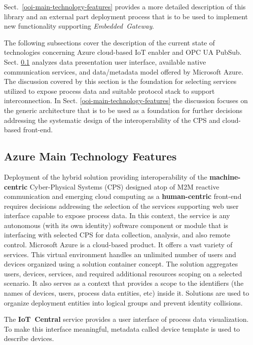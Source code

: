 \documentclass[runningheads]{llncs}
\begin{document}
Sect.~\ref{ooi-main-technology-features} provides a more detailed description of this library and an external part deployment process that is to be used to implement new functionality supporting \emph{Embedded\ Gateway}.

The following subsections cover the description of the current state of technologies concerning Azure cloud-based IoT enabler and OPC UA PubSub. Sect. \ref{azure-main-technology-features} analyzes data presentation user interface, available native communication services, and data/metadata model offered by Microsoft Azure. The discussion covered by this section is the foundation for selecting services utilized to expose process data and suitable protocol stack to support interconnection. In Sect. \ref{ooi-main-technology-features} the discussion focuses on the generic architecture that is to be used as a foundation for further decisions addressing the systematic design of the interoperability of the CPS and cloud-based front-end.

\subsection{Azure Main Technology Features}\label{azure-main-technology-features}

Deployment of the hybrid solution providing interoperability of the \textbf{machine-centric} Cyber-Physical Systems (CPS) designed atop of M2M reactive communication and emerging cloud computing as a \textbf{human-centric} front-end requires decisions addressing the selection of the services supporting web user interface capable to expose process data. In this context, the service is any autonomous (with its own identity) software component or module that is interfacing with selected CPS for data collection, analysis, and also remote control. Microsoft Azure is a cloud-based product. It offers a vast variety of services. This virtual environment handles an unlimited number of users and devices organized using a solution container concept. The solution aggregates users, devices, services, and required additional resources scoping on a selected scenario. It also serves as a context that provides a scope to the identifiers (the names of devices, users, process data entities, etc) inside it. Solutions are used to organize deployment entities into logical groups and prevent identity collisions.

The \textbf{IoT\ Central} service provides a user interface of process data visualization. To make this interface meaningful, metadata called device template is used to describe devices.
\end{document}
